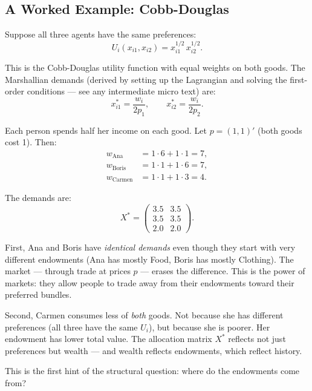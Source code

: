 \documentclass[../structural_economics_book.tex]{subfiles}
\begin{document}
\subsection{A Worked Example: Cobb-Douglas}

Suppose all three agents have the same preferences:
\begin{equation}
U_i(x_{i1}, x_{i2}) = x_{i1}^{1/2} \, x_{i2}^{1/2}.
\end{equation}

This is the Cobb-Douglas utility function with equal weights on both goods. The Marshallian demands (derived by setting up the Lagrangian and solving the first-order conditions --- see any intermediate micro text) are:
\begin{equation}\label{ch01:eq:CD_demand}
x_{i1}^* = \frac{w_i}{2p_1}, \qquad x_{i2}^* = \frac{w_i}{2p_2}.
\end{equation}

Each person spends half her income on each good. Let $p = (1, 1)'$ (both goods cost 1). Then:
\begin{align}
w_{\text{Ana}} &= 1 \cdot 6 + 1 \cdot 1 = 7, \\
w_{\text{Boris}} &= 1 \cdot 1 + 1 \cdot 6 = 7, \\
w_{\text{Carmen}} &= 1 \cdot 1 + 1 \cdot 3 = 4.
\end{align}

The demands are:
\begin{equation}
X^* = \begin{pmatrix} 3.5 & 3.5 \\ 3.5 & 3.5 \\ 2.0 & 2.0 \end{pmatrix}.
\end{equation}

\begin{intuition}
First, Ana and Boris have \textit{identical demands} even though they start with very different endowments (Ana has mostly Food, Boris has mostly Clothing). The market --- through trade at prices $p$ --- erases the difference. This is the power of markets: they allow people to trade away from their endowments toward their preferred bundles.

Second, Carmen consumes less of \textit{both} goods. Not because she has different preferences (all three have the same $U_i$), but because she is poorer. Her endowment has lower total value. The allocation matrix $X^*$ reflects not just preferences but wealth --- and wealth reflects endowments, which reflect history.

This is the first hint of the structural question: where do the endowments come from?
\end{intuition}
\end{document}
